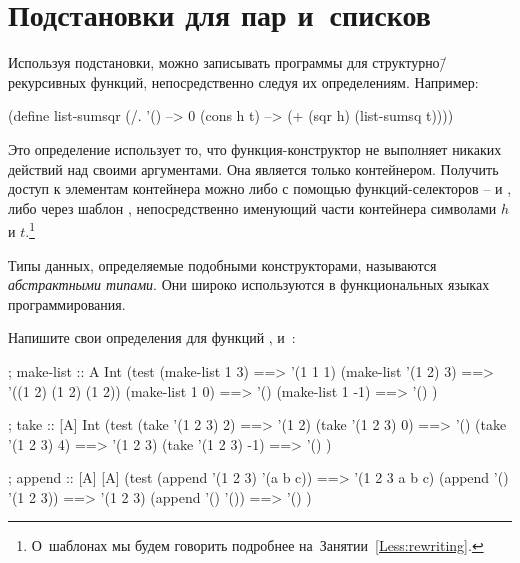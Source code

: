 \section[3]{Подстановки для пар и~списков}%
Используя подстановки, можно записывать программы для структурно\=/рекурсивных функций, непосредственно следуя их определениям. Например:

\begin{SchemeCode}[emph={h,t}]
(define list-sumsqr
  (/. '() --> 0
      (cons h t) --> (+ (sqr h) (list-sumsq t))))
\end{SchemeCode}

Это определение использует то, что функция-конструктор  не выполняет никаких действий над своими аргументами. Она является только контейнером. Получить доступ к элементам контейнера можно либо с помощью функций-селекторов --  и , либо через шаблон , непосредственно именующий части контейнера символами $h$ и $t$.\footnote{О~шаблонах мы будем говорить подробнее на~Занятии~\ref{Less:rewriting}.}

Типы данных, определяемые подобными конструкторами, называются \emph{абстрактными типами}. Они широко используются в функциональных языках программирования.

\begin{Assignment}
Напишите свои определения для функций ,  и~:

\begin{Specification}
; make-list :: A Int \arrow [A]
(test 
  (make-list 1 3)      ==> '(1 1 1)
  (make-list '(1 2) 3) ==> '((1 2) (1 2) (1 2))
  (make-list 1 0)      ==> '()
  (make-list 1 -1)     ==> '() )
\end{Specification}

\vspace{-\medskipamount}
\begin{Specification}
; take :: [A] Int \arrow [A]
(test 
  (take '(1 2 3) 2)    ==>  '(1 2)
  (take '(1 2 3) 0)    ==>  '()
  (take '(1 2 3) 4)    ==>  '(1 2 3)
  (take '(1 2 3) -1)   ==>  '() )
\end{Specification}

\vspace{-\medskipamount}
\begin{Specification}
; append :: [A] [A] \arrow [A]
(test 
  (append '(1 2 3) '(a b c)) ==>  '(1 2 3 a b c)
  (append '() '(1 2 3))      ==>  '(1 2 3)
  (append '() '())           ==>  '() )
\end{Specification}
\end{Assignment}

